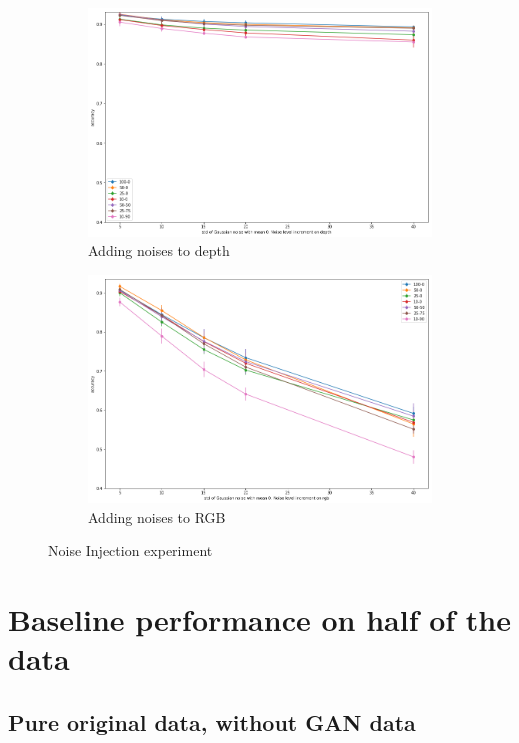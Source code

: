 \begin{figure}[h]
	\centering
	\begin{subfigure}{0.49\textwidth}
		\centering
		\includegraphics[width=\textwidth]{img/noise_injection_depth}
		\caption{Adding noises to depth}
	\end{subfigure}
	\begin{subfigure}{0.49\textwidth}
		\centering
		\includegraphics[width=\textwidth]{img/noise_injection_rgb}
		\caption{Adding noises to RGB}
	\end{subfigure}
	\caption{Noise Injection experiment}
	\label{fig:noise_injection}
\end{figure}

\section{Baseline performance on half of the data}
\subsection{Pure original data, without GAN data}
